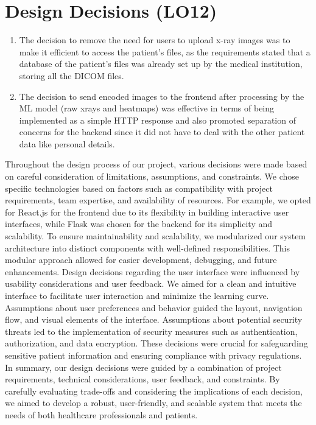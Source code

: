 \documentclass{article}
\begin{document}
\section{Design Decisions (LO12)}


\begin{enumerate}
    \item  The decision to remove the need for users to upload x-ray images was to make it efficient to access the patient's files, as the requirements stated that a database of the patient's files was already set up by the medical institution, storing all the DICOM files.
    \item The decision to send encoded images to the frontend after processing by the ML model (raw xrays and heatmaps) was effective in terms of being implemented as a simple HTTP response and also promoted separation of concerns for the backend since it did not have to deal with the other patient data like personal details.
\end{enumerate}
Throughout the design process of our project, various decisions were made based on careful consideration of limitations, assumptions, and constraints. We chose specific technologies based on factors such as compatibility with project requirements, team expertise, and availability of resources. For example, we opted for React.js for the frontend due to its flexibility in building interactive user interfaces, while Flask was chosen for the backend for its simplicity and scalability. To ensure maintainability and scalability, we modularized our system architecture into distinct components with well-defined responsibilities. This modular approach allowed for easier development, debugging, and future enhancements. Design decisions regarding the user interface were influenced by usability considerations and user feedback. We aimed for a clean and intuitive interface to facilitate user interaction and minimize the learning curve. Assumptions about user preferences and behavior guided the layout, navigation flow, and visual elements of the interface. Assumptions about potential security threats led to the implementation of security measures such as authentication, authorization, and data encryption. These decisions were crucial for safeguarding sensitive patient information and ensuring compliance with privacy regulations. In summary, our design decisions were guided by a combination of project requirements, technical considerations, user feedback, and constraints. By carefully evaluating trade-offs and considering the implications of each decision, we aimed to develop a robust, user-friendly, and scalable system that meets the needs of both healthcare professionals and patients.
\end{document}
